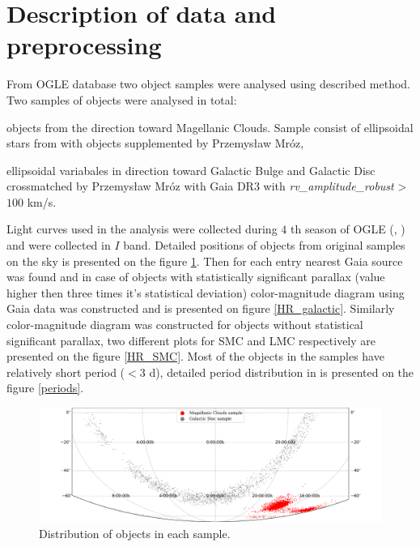 \documentclass{pracalicmgr}
\newenvironment{itemize*}%
  {\vspace{-\topsep}
    \begin{itemize}%
    \setlength{\itemsep}{0pt}%
    \setlength{\parskip}{0pt}}%
  {\end{itemize}
  \vspace{-\topsep}}
\begin{document}
\section{Description of data and preprocessing}
From OGLE database two object samples were analysed using described method.
Two samples of objects were analysed in total:
\begin{itemize*}
    \item objects from the direction toward Magellanic Clouds. Sample consist of ellipsoidal stars from \citet{pawlak_ogle_2016} with objects supplemented 
    by Przemysław Mróz, 
    \item ellipsoidal variabales in direction toward Galactic Bulge and Galactic Disc crossmatched by Przemysław Mróz with Gaia DR3 
    \citep{gaia_collaboration_gaia_2022} with {\it{rv\_amplitude\_robust}} > $100$ km/s.
\end{itemize*}
Light curves used in the analysis were collected during $4$ th season of OGLE (\citet*{udalski_ogle-iv_2015},
\citet*{udalski_optical_1992}) and were collected in $I$ band.
Detailed positions of objects from original samples on the sky is presented on the figure \ref{map}. Then for each entry nearest Gaia source 
was found and in case of objects with statistically significant parallax (value higher then three times it's statistical deviation) color-magnitude
diagram using Gaia data was constructed and is presented on figure \ref{HR_galactic}. Similarly color-magnitude diagram was constructed for
objects without statistical significant parallax, two different plots for SMC and LMC respectively are presented on the figure 
\ref{HR_SMC}. Most of the objects in the samples have relatively short period ($<3$ d), detailed period distribution in
is presented on the figure \ref{periods}.
\begin{figure}
    \begin{center}
        \includegraphics[scale=0.52]{plots/map_sample.png}
    \end{center}
    \caption{Distribution of objects in each sample.}
    \label{map}
\end{figure}
\end{document}
